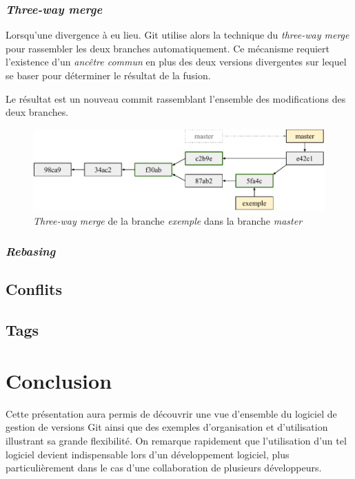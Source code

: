 \documentclass[11pt,a4paper]{article}
\begin{document}
\subsubsection{\textit{Three-way merge}}

Lorsqu'une divergence à eu lieu. Git utilise alors la technique du \textit{three-way merge} pour rassembler les deux branches automatiquement. Ce mécanisme requiert l'existence d'un \textit{ancêtre commun} en plus des deux versions divergentes sur lequel se baser pour déterminer le résultat de la fusion.

Le résultat est un nouveau commit rassemblant l'ensemble des modifications des deux branches.

\begin{figure}[h]
\begin{center}
\includegraphics[width=13cm]{img_twmerge}
\caption{\textit{Three-way merge} de la branche \textit{exemple} dans la branche \textit{master}}
\end{center}
\end{figure}

\subsubsection{\textit{Rebasing}}

\subsection{Conflits}

\subsection{Tags}

\section{Conclusion}

Cette présentation aura permis de découvrir une vue d'ensemble du logiciel de gestion de versions Git ainsi que des exemples d'organisation et d'utilisation illustrant sa grande flexibilité. On remarque rapidement que l'utilisation d'un tel logiciel devient indispensable lors d'un développement logiciel, plus particulièrement dans le cas d'une collaboration de plusieurs développeurs.
\end{document}
